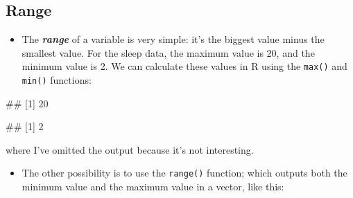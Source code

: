 \documentclass[
]{book}
\newenvironment{Shaded}{\begin{snugshade}}{\end{snugshade}}
\newcommand{\FunctionTok}[1]{\textcolor[rgb]{0.00,0.00,0.00}{#1}}
\newcommand{\NormalTok}[1]{#1}
\newcommand{\SpecialCharTok}[1]{\textcolor[rgb]{0.00,0.00,0.00}{#1}}
\providecommand{\tightlist}{%
  \setlength{\itemsep}{0pt}\setlength{\parskip}{0pt}}
\begin{document}
\hypertarget{range}{%
\subsection{Range}\label{range}}

\begin{itemize}
\tightlist
\item
  The \textbf{\emph{range}} of a variable is very simple: it's the biggest value minus the smallest value. For the sleep data, the maximum value is 20, and the minimum value is 2. We can calculate these values in R using the \texttt{max()} and \texttt{min()} functions:
\end{itemize}

\begin{Shaded}
\end{Shaded}

\begin{Shaded}
\begin{Highlighting}[]
\NormalTok{\#\# [1] 20}
\end{Highlighting}
\end{Shaded}

\begin{Shaded}
\end{Shaded}

\begin{Shaded}
\begin{Highlighting}[]
\NormalTok{\#\# [1] 2}
\end{Highlighting}
\end{Shaded}

where I've omitted the output because it's not interesting.

\begin{itemize}
\tightlist
\item
  The other possibility is to use the \texttt{range()} function; which outputs both the minimum value and the maximum value in a vector, like this:
\end{itemize}

\begin{Shaded}
\end{Shaded}
\end{document}
